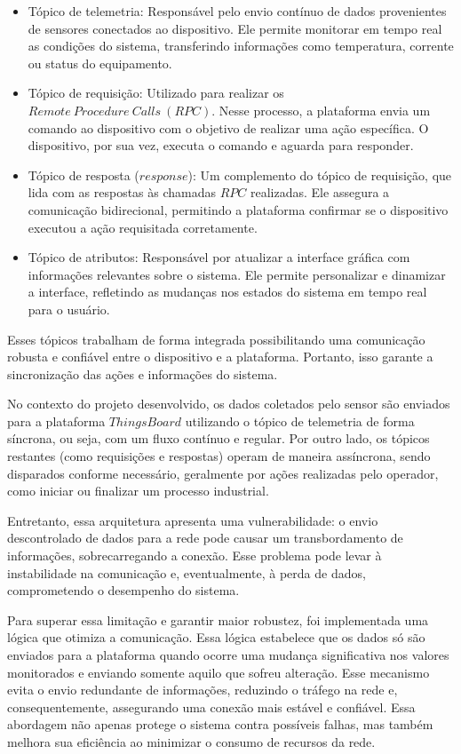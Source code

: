 \documentclass{ecatfg}
\begin{document}
\begin{itemize}
\item Tópico de telemetria: Responsável pelo envio contínuo de dados provenientes de sensores conectados ao dispositivo. Ele permite monitorar em tempo real as condições do sistema, transferindo informações como temperatura, corrente ou status do equipamento.
\item Tópico de requisição: Utilizado para realizar os $Remote\ Procedure\ Calls\ (RPC)$. Nesse processo, a plataforma envia um comando ao dispositivo com o objetivo de realizar uma ação específica. O dispositivo, por sua vez, executa o comando e aguarda para responder.
\item Tópico de resposta ($response$): Um complemento do tópico de requisição, que lida com as respostas às chamadas $RPC$ realizadas. Ele assegura a comunicação bidirecional, permitindo a plataforma confirmar se o dispositivo executou a ação requisitada corretamente.
\item Tópico de atributos: Responsável por atualizar a interface gráfica com informações relevantes sobre o sistema. Ele permite personalizar e dinamizar a interface, refletindo as mudanças nos estados do sistema em tempo real para o usuário.
\end{itemize}

Esses tópicos trabalham de forma integrada possibilitando uma comunicação robusta e confiável entre o dispositivo e a plataforma. Portanto, isso garante a sincronização das ações e informações do sistema. \par

No contexto do projeto desenvolvido, os dados coletados pelo sensor são enviados para a plataforma $ThingsBoard$ utilizando o tópico de telemetria de forma síncrona, ou seja, com um fluxo contínuo e regular. Por outro lado, os tópicos restantes (como requisições e respostas) operam de maneira assíncrona, sendo disparados conforme necessário, geralmente por ações realizadas pelo operador, como iniciar ou finalizar um processo industrial. \par

Entretanto, essa arquitetura apresenta uma vulnerabilidade: o envio descontrolado de dados para a rede pode causar um transbordamento de informações, sobrecarregando a conexão. Esse problema pode levar à instabilidade na comunicação e, eventualmente, à perda de dados, comprometendo o desempenho do sistema. \par

Para superar essa limitação e garantir maior robustez, foi implementada uma lógica que otimiza a comunicação. Essa lógica estabelece que os dados só são enviados para a plataforma quando ocorre uma mudança significativa nos valores monitorados e enviando somente aquilo que sofreu alteração. Esse mecanismo evita o envio redundante de informações, reduzindo o tráfego na rede e, consequentemente, assegurando uma conexão mais estável e confiável. Essa abordagem não apenas protege o sistema contra possíveis falhas, mas também melhora sua eficiência ao minimizar o consumo de recursos da rede. \par
\end{document}
